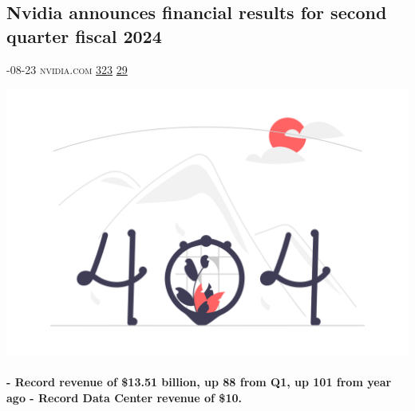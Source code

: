 \documentclass[10pt,a4paper]{article}
\begin{document}
\begin{multicols*}{2}
\begin{minipage}{\linewidth}
\subsection{Nvidia announces financial results for second quarter fiscal 2024}
\textsc{\footnotesize
{\scriptsize\faCalendar}-08-23 
{\scriptsize\faGlobe}\space 
nvidia.com 
{\scriptsize\faThumbsOUp}\space 
\href{http://news.ycombinator.com/item?id=37241487\&utm\_term=comment}{323} 
{\scriptsize\faComments}\space 
\href{http://news.ycombinator.com/item?id=37241487\&utm\_term=comment}{29} 
}
\par\medskip\noindent
\href{https://nvidianews.nvidia.com/news/nvidia-announces-financial-results-for-second-quarter-fiscal-2024?utm\_source=hackernewsletter\&utm\_medium=email\&utm\_term=startup\_news}{
    \includegraphics[width=0.99\linewidth]{notfound.png}
}
\end{minipage}
\paragraph{}
\textbf{- Record revenue of \$13.51 billion, up 88 from Q1, up 101 from year ago
- Record Data Center revenue of \$10.}

\end{multicols*}
\end{document}
